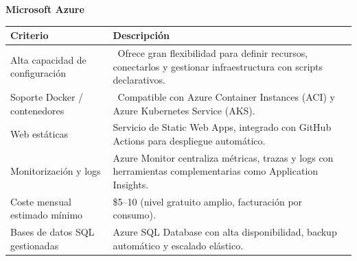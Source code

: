 \vspace{8pt}

\begin{center}
	\renewcommand{\arraystretch}{1.2}
	\setlength{\tabcolsep}{6pt}
	\textbf{Microsoft Azure}\\[4pt]
	\begin{tabularx}{\textwidth}{|l|X|}
		\hline
		\textbf{Criterio}               & \textbf{Descripción}                                                                                                          \\
		\hline
		Alta capacidad de configuración & \checkmark\ Ofrece gran flexibilidad para definir recursos, conectarlos y gestionar infraestructura con scripts declarativos. \\
		\hline
		Soporte Docker / contenedores   & \checkmark\ Compatible con Azure Container Instances (ACI) y Azure Kubernetes Service (AKS).                                  \\
		\hline
		Web estáticas                   & Servicio de Static Web Apps, integrado con GitHub Actions para despliegue automático.                                         \\
		\hline
		Monitorización y logs           & Azure Monitor centraliza métricas, trazas y logs con herramientas complementarias como Application Insights.                  \\
		\hline
		Coste mensual estimado mínimo   & \$5--10 (nivel gratuito amplio, facturación por consumo).                                                                     \\
		\hline
		Bases de datos SQL gestionadas  & Azure SQL Database con alta disponibilidad, backup automático y escalado elástico.                                            \\
		\hline
	\end{tabularx}
\end{center}

\vspace{8pt}

